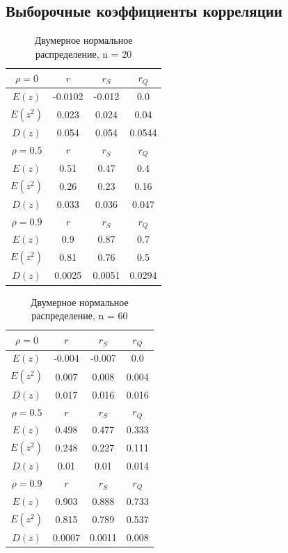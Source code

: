 \subsection{Выборочные коэффициенты корреляции}
\begin{table}[H]
	\centering
	\begin{tabular}{| c | c | c | c |}
		
		\hline
		$\rho=0$  & $r$      & $r_S$  & $r_Q$ \\
		\hline
        $E(z)$   & -0.0102 & -0.012 & 0.0   \\
        $E(z^{2})$  & 0.023 & 0.024 & 0.04  \\
        $D(z)$   & 0.054 & 0.054 & 0.0544 \\
		\hline
		$\rho=0.5$ & $r$      & $r_S$  & $r_Q$ \\
		\hline
		$E(z)$      & 0.51 & 0.47 & 0.4   \\
        $E(z^{2})$   & 0.26 & 0.23 & 0.16  \\
        $D(z)$     & 0.033 & 0.036 & 0.047 \\
		\hline
		$\rho=0.9$  & $r$      & $r_S$  & $r_Q$ \\
		\hline
		$E(z)$      & 0.9 & 0.87 & 0.7   \\
        $E(z^{2})$   & 0.81 & 0.76 & 0.5  \\
        $D(z)$      & 0.0025 & 0.0051 & 0.0294 \\
		\hline
		
	\end{tabular}{}
	\caption{Двумерное нормальное распределение, n = 20}
	\label{tab:n20}
\end{table}
\begin{table}[H]
	\centering
	\begin{tabular}{| c | c | c | c |}
		
		\hline
		$\rho = 0$ & $r$      & $r_S$  & $r_Q$ \\
		\hline
		$E(z)$     & -0.004 & -0.007 & 0.0   \\
        $E(z^{2})$  & 0.007 & 0.008 & 0.004 \\
        $D(z)$    & 0.017 & 0.016 & 0.016 \\
		\hline
		$\rho = 0.5$ & $r$      & $r_S$  & $r_Q$ \\
		\hline
		$E(z)$      & 0.498 & 0.477 & 0.333 \\
        $E(z^{2})$    & 0.248 & 0.227 & 0.111 \\
        $D(z)$      & 0.01 & 0.01 & 0.014 \\
		\hline
		$\rho = 0.9$ & $r$      & $r_S$  & $r_Q$ \\
		\hline
		$E(z)$      & 0.903 & 0.888 & 0.733 \\
        $E(z^{2})$    & 0.815 & 0.789 & 0.537 \\
        $D(z)$      & 0.0007 & 0.0011 & 0.008 \\
		\hline
		
	\end{tabular}{}
	\caption{Двумерное нормальное распределение, n = 60}
	\label{tab:n60}
\end{table}

